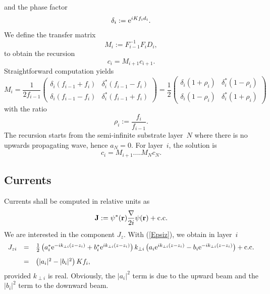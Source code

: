 and the phase factor
\begin{equation}
   \delta_i := {\rm e}^{iKf_id_i}.
\end{equation}
We define the transfer matrix
\begin{equation}\label{Edef_M}
  M_i
  := F_{i-1}^{-1}F_i D_i,
\end{equation}
to obtain the recursion 
\begin{equation}\label{EcMc}
  c_i = M_{i+1} c_{i+1}.
\end{equation}
Straightforward computation yields
\begin{equation}
  M_i
   = \frac{1}{2f_{i-1}}
   \left(\begin{array}{cc}
       \delta_i(f_{i-1}+f_{i})&\delta_i^*(f_{i-1}-f_{i})\\
       \delta_i(f_{i-1}-f_{i})&\delta_i^*(f_{i-1}+f_{i})
   \end{array}\right)
   = \frac{1}{2}
   \left(\begin{array}{cc}
       \delta_i(1+\rho_{i})&\delta_i^*(1-\rho_{i})\\
       \delta_i(1-\rho_{i})&\delta_i^*(1+\rho_{i})
   \end{array}\right)
\end{equation}
with the ratio
\begin{equation}
  \rho_i := \frac{f_{i}}{f_{i-1}}.
\end{equation}
The recursion starts from the semi-infinite substrate layer~$N$
where there is no upwards propagating wave, hence $a_N=0$.
For layer~$i$, the solution is
\begin{equation}\label{Eci}
  c_i
  =
  M_{i+1}.... M_{N} c_N.  %
\end{equation}

\subsection{Currents}

Currents shall be computed in relative units as
\begin{equation}
  \mathbf{J}:=\psi^*(\mathbf{r})\frac{\mathbf{\nabla}}{2i}\psi(\mathbf{r})+\text{c.c.}
\end{equation}
We are interested in the component $J_z$.
With (\ref{Epsiz}),
we obtain in layer~$i$
\begin{equation}\label{EJperp}
  \begin{array}{lcl}
  J_{zi} &=& \frac{1}{2}
  \left( a_i^*{\rm e}^{-ik_{\perp i}(z-z_i)} + b_i^*{\rm e}^{ik_{\perp i}(z-z_i)} \right)
  k_{\perp i}
  \left( a_i{\rm e}^{ik_{\perp i}(z-z_i)} - b_i{\rm e}^{-ik_{\perp i}(z-z_i)} \right)
  +\text{c.c.}\\[2ex]
  &=& \left( |a_i|^2 - |b_i|^2 \right) K f_i,
  \end{array}
\end{equation}
provided $k_{\perp i}$ is real.
Obviously,
the $|a_i|^2$ term is due to the upward beam
and the $|b_i|^2$ term to the downward beam.

